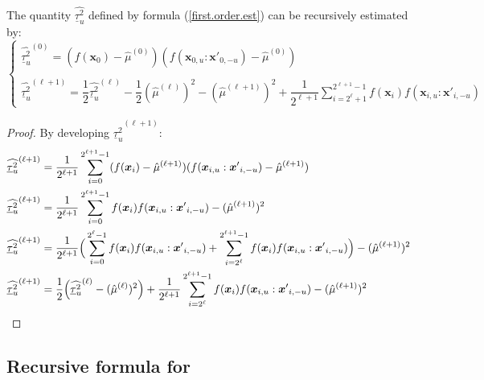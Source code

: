\documentclass[]{elsarticle}
\makeatletter
\theoremstyle{definition}
\newcommand{\bvec}[1]{\boldsymbol{#1}}
\newcommand{\vx}{\bvec{x}}
\newcommand*{\ov}[1]{
  \m@th\overline{\mbox{#1}\raisebox{2mm}{}}
}
\makeatother
\begin{document}
The quantity $\widehat{\underline{\tau}_u^2}$ defined by formula (\ref{first.order.est}) can be recursively estimated by:
\begin{equation}
\left\lbrace \begin{array}{l}
\widehat{\underline{\tau}_u^2}^{(0)}= (f(\vx_0)-\hat{\mu}^{(0)})(f(\vx_{0,u}:{\vx'}_{0,-u})-\hat{\mu}^{(0)}) \\
\\
\widehat{\underline{\tau}_u^2}^{(\ell+1)} =  \dfrac{1}{2} \widehat{\underline{\tau}_u^2}^{(\ell)} - \dfrac{1}{2} (\hat{\mu}^{(\ell)})^2 - (\hat{\mu}^{(\ell+1)})^2 + \dfrac{1}{2^{\ell+1}} \sum \limits_{i=2^{\ell}+1}^{2^{\ell+1}-1} f(\vx_i) f(\vx_{i,u}:{\vx'}_{i,-u})
\end{array}\right.
\label{first.order.est.rec}
\end{equation}
\begin{proof}
By developing $\widehat{\underline{\tau}_u^2}^{(\ell+1)}$:
\begin{align*}
\widehat{\underline{\tau}_u^2}^{(\ell+1)} &= \frac{1}{2^{\ell+1}} \sum \limits_{i=0}^{2^{\ell+1}-1} (f(\vx_i)-\hat{\mu}^{(\ell+1)})(f(\vx_{i,u}:{\vx'}_{i,-u})-\hat{\mu}^{(\ell+1)}) \\
\widehat{\underline{\tau}_u^2}^{(\ell+1)} &= \frac{1}{2^{\ell+1}} \sum \limits_{i=0}^{2^{\ell+1}-1} f(\vx_i)f(\vx_{i,u}:{\vx'}_{i,-u})-(\hat{\mu}^{(\ell+1)})^2 \\
\widehat{\underline{\tau}_u^2}^{(\ell+1)} &= \frac{1}{2^{\ell+1}} \Big{(}\sum \limits_{i=0}^{2^{\ell}-1} f(\vx_i)f(\vx_{i,u}:{\vx'}_{i,-u}) + \sum \limits_{i=2^{\ell}}^{2^{\ell+1}-1} f(\vx_i)f(\vx_{i,u}:{\vx'}_{i,-u})\Big{)} -(\hat{\mu}^{(\ell+1)})^2 \\
\widehat{\underline{\tau}_u^2}^{(\ell+1)} &= \dfrac{1}{2}\Big{(}\widehat{\underline{\tau}_u^2}^{(\ell)}-(\hat{\mu}^{(\ell)})^2\Big{)} + \frac{1}{2^{\ell+1}} \sum \limits_{i=2^{\ell}}^{2^{\ell+1}-1} f(\vx_i)f(\vx_{i,u}:{\vx'}_{i,-u})-(\hat{\mu}^{(\ell+1)})^2 \\
\end{align*}
\end{proof}

\subsection{Recursive formula for} 
\end{document}
